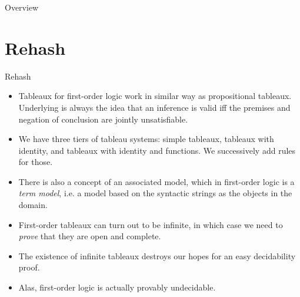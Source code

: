\setcounter{framenumber}{346}
\begin{frame}
	\maketitle
\end{frame}

\begin{frame}{Overview}
\tableofcontents
\end{frame}

\section{Rehash}
\begin{frame}{Rehash}
	
\begin{itemize}
	
		\item Tableaux for first-order logic work in similar
                  way as propositional tableaux. Underlying is always
                  the idea that an inference is valid iff the premises
                  and negation of conclusion are jointly
                  unsatisfiable.
                  
		\item We have three tiers of tableau systems: simple
                  tableaux, tableaux with identity, and tableaux with
                  identity and functions. We successively add
                  rules for those.
		
		\item There is also a concept of an associated model,
                  which in first-order logic is a \emph{term model},
                  i.e. a model based on the syntactic strings as the
                  objects in the domain.
		
		\item First-order tableaux can turn out to be
                  infinite, in which case we need to \emph{prove} that
                  they are open and complete.
		
		\item The existence of infinite tableaux destroys our
                  hopes for an easy decidability proof.
		
		\item Alas, first-order logic is actually provably
                  undecidable.
		
					
\end{itemize}

\end{frame}
		

